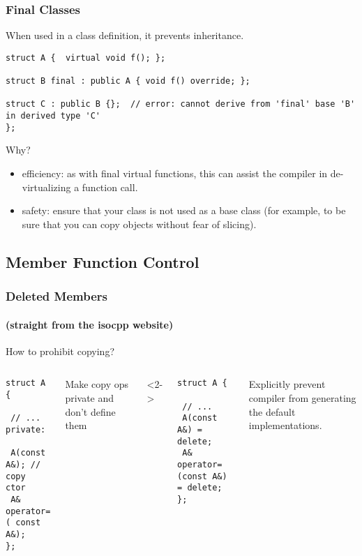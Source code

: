 
\begin{frame}[fragile]
\frametitle{Final Classes}
When used in a class definition, it prevents inheritance.
{\scriptsize
\begin{verbatim}
struct A {  virtual void f(); };

struct B final : public A { void f() override; };

struct C : public B {};  // error: cannot derive from 'final' base 'B' in derived type 'C'
};
\end{verbatim}
}
Why?
\begin{itemize}
\item efficiency: as with final virtual functions, this can assist the
  compiler in de-virtualizing a function call.
\item safety: ensure that your class is not used as a base class (for example, to be sure that you can copy objects without fear of slicing).
\end{itemize}

    
\end{frame}


\subsection{Member Function Control}

\begin{frame}[fragile]
\frametitle{Deleted Members}
\framesubtitle{(straight from the isocpp website)}
How to prohibit copying?
\vskip 12pt
\begin{columns}[t]
{\scriptsize

\begin{verbatim}
struct A {

 // ...
private:

 A(const A&); // copy ctor
 A& operator=( const A&);
};
\end{verbatim}

Make copy ops private and don't define them
}
<2->
{\scriptsize
\begin{verbatim}
struct A {

 // ...
 A(const A&) = delete;
 A& operator=(const A&) = delete;
};
\end{verbatim}

Explicitly prevent compiler from generating the default implementations.
}
\end{columns}

\end{frame}


